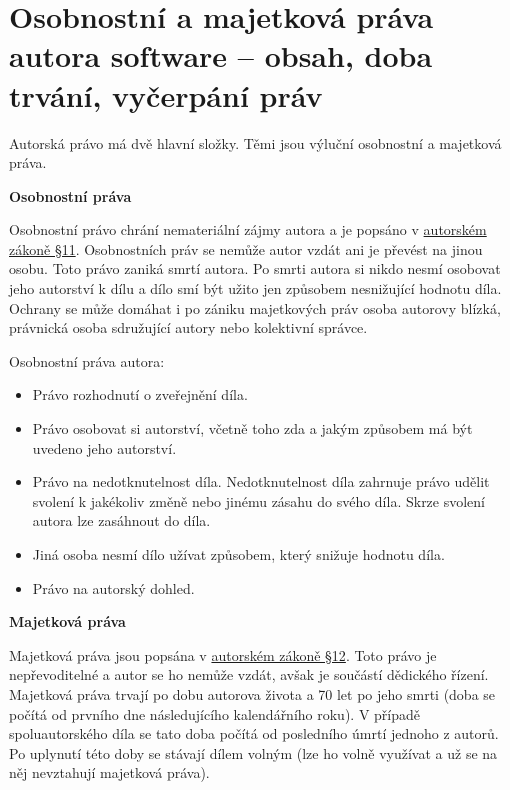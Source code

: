 \newpage
\section{Osobnostní a majetková práva autora software -- obsah, doba trvání, vyčerpání práv}

Autorská právo má dvě hlavní složky. Těmi jsou výluční osobnostní a majetková práva. 

\vspace{0,5cm}
\begin{Large}
\textbf{Osobnostní práva}
\end{Large}

Osobnostní právo chrání nemateriální zájmy autora a je popsáno v \href{https://www.zakonyprolidi.cz/cs/2000-121#p11}{autorském zákoně §11}. Osobnostních práv se nemůže autor vzdát ani je převést na jinou osobu. Toto právo zaniká smrtí autora. Po smrti autora si nikdo nesmí osobovat jeho autorství k dílu a dílo smí být užito jen způsobem nesnižující hodnotu díla. Ochrany se může domáhat i po zániku majetkových práv osoba autorovy blízká, právnická osoba sdružující autory nebo kolektivní správce. 


Osobnostní práva autora:
\begin{itemize}[noitemsep]
    \item Právo rozhodnutí o zveřejnění díla.
    \item Právo osobovat si autorství, včetně toho zda a jakým způsobem má být uvedeno jeho autorství.
    \item Právo na nedotknutelnost díla. Nedotknutelnost díla zahrnuje právo udělit svolení k jakékoliv změně nebo jinému zásahu do svého díla. Skrze svolení autora lze zasáhnout do díla.
    \item Jiná osoba nesmí dílo užívat způsobem, který snižuje hodnotu díla.
    \item Právo na autorský dohled.
\end{itemize}


\vspace{0,5cm}
\begin{Large}
\textbf{Majetková práva}
\end{Large}

Majetková práva jsou popsána v \href{https://www.zakonyprolidi.cz/cs/2000-121#p12}{autorském zákoně §12}. Toto právo je nepřevoditelné a autor se ho nemůže vzdát, avšak je součástí dědického řízení.
Majetková práva trvají po dobu autorova života a 70 let po jeho smrti (doba se počítá od prvního dne následujícího kalendářního roku). V případě spoluautorského díla se tato doba počítá od posledního úmrtí jednoho z autorů. Po uplynutí této doby se stávají dílem volným (lze ho volně využívat a už se na něj nevztahují majetková práva). 

